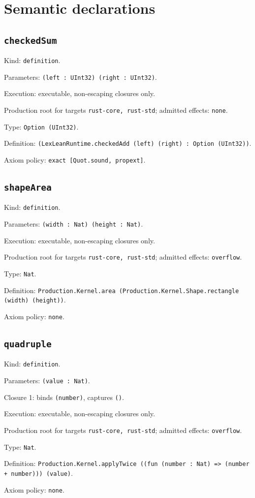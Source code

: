 \documentclass[11pt]{article}
\begin{document}
\section*{Semantic declarations}
\subsection*{\texttt{checkedSum}}
\noindent Kind: \texttt{definition}.\par
\noindent Parameters: \texttt{(left : UInt32) (right : UInt32)}.\par
\noindent Execution: executable, non-escaping closures only.\par
\noindent Production root for targets \texttt{rust-core, rust-std}; admitted effects: \texttt{none}.\par
\noindent Type: \texttt{Option (UInt32)}.\par
\noindent Definition: \texttt{(LexLeanRuntime.checkedAdd (left) (right) : Option (UInt32))}.\par
\noindent Axiom policy: \texttt{exact [Quot.sound, propext]}.\par
\subsection*{\texttt{shapeArea}}
\noindent Kind: \texttt{definition}.\par
\noindent Parameters: \texttt{(width : Nat) (height : Nat)}.\par
\noindent Execution: executable, non-escaping closures only.\par
\noindent Production root for targets \texttt{rust-core, rust-std}; admitted effects: \texttt{overflow}.\par
\noindent Type: \texttt{Nat}.\par
\noindent Definition: \texttt{Production.Kernel.area (Production.Kernel.Shape.rectangle (width) (height))}.\par
\noindent Axiom policy: \texttt{none}.\par
\subsection*{\texttt{quadruple}}
\noindent Kind: \texttt{definition}.\par
\noindent Parameters: \texttt{(value : Nat)}.\par
\noindent Closure 1: binds \texttt{(number)}, captures \texttt{()}.\par
\noindent Execution: executable, non-escaping closures only.\par
\noindent Production root for targets \texttt{rust-core, rust-std}; admitted effects: \texttt{overflow}.\par
\noindent Type: \texttt{Nat}.\par
\noindent Definition: \texttt{Production.Kernel.applyTwice ((fun (number : Nat) => (number + number))) (value)}.\par
\noindent Axiom policy: \texttt{none}.\par
\end{document}
